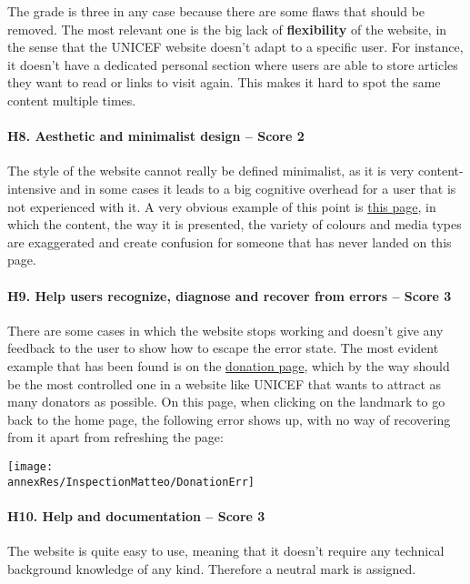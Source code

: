 The grade is three in any case because there are some flaws that should be removed. The most relevant one is the big lack of \textbf{flexibility} of the website, in the sense that the UNICEF website doesn't adapt to a specific user. For instance, it doesn't have a dedicated personal section where users are able to store articles they want to read or links to visit again. This makes it hard to spot the same content multiple times.




\paragraph*{H8. Aesthetic and minimalist design – Score 2}
The style of the website cannot really be defined minimalist, as it is very content-intensive and in some cases it leads to a big cognitive overhead for a user that is not experienced with it. A very obvious example of this point is \href{https://www.unicef.org/reports/state-worlds-children-2023#SOWC}{this page}, in which the content, the way it is presented, the variety of colours and media types are exaggerated and create confusion for someone that has never landed on this page.

\paragraph*{H9. Help users recognize, diagnose and recover from errors – Score 3}
There are some cases in which the website stops working and doesn't give any feedback to the user to show how to escape the error state. The most evident example that has been found is on the \href{https://donazioni.unicef.it/landing/2021/07/donazioni_home/#}{donation page}, which by the way should be the most controlled one in a website like UNICEF that wants to attract as many donators as possible. 
On this page, when clicking on the landmark to go back to the home page, the following error shows up, with no way of recovering from it apart from refreshing the page:

\begin{center}
	\texttt{[image: \\annexRes/InspectionMatteo/DonationErr]}
	
\end{center}


\paragraph*{H10. Help and documentation – Score 3}
The website is quite easy to use, meaning that it doesn't require any technical background knowledge of any kind. Therefore a neutral mark is assigned.


